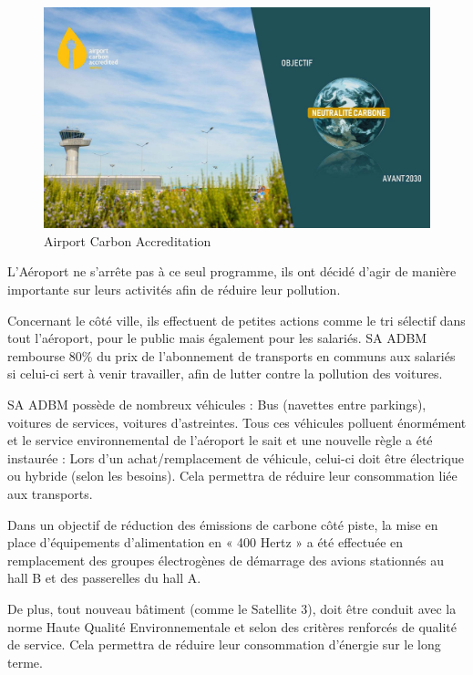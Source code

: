 \begin{figure}[hbt!]
  \centering
  \includegraphics[width=12cm]{Images/aca2030.jpg}
  \caption{Airport Carbon Accreditation}
  \label{fig:aca2030}
\end{figure}


L'Aéroport ne s'arrête pas à ce seul programme, ils ont décidé d'agir de manière importante sur leurs activités afin de réduire leur pollution.

Concernant le côté ville, ils effectuent de petites actions comme le tri sélectif dans tout l'aéroport, pour le public mais également pour les salariés. SA ADBM rembourse 80\% du prix de l'abonnement de transports en communs aux salariés si celui-ci sert à venir travailler, afin de lutter contre la pollution des voitures.

SA ADBM possède de nombreux véhicules : Bus (navettes entre parkings), voitures de services, voitures d'astreintes. Tous ces véhicules polluent énormément et le service environnemental de l'aéroport le sait et une nouvelle règle a été instaurée : Lors d'un achat/remplacement de véhicule, celui-ci doit être électrique ou hybride (selon les besoins). Cela permettra de réduire leur consommation liée aux transports.\newline


Dans un objectif de réduction des émissions de carbone côté piste, la mise en place d’équipements d’alimentation en « 400 Hertz » a été effectuée en remplacement des groupes électrogènes de démarrage des avions stationnés au hall B et des passerelles du hall A.

De plus, tout nouveau bâtiment (comme le Satellite 3), doit être conduit avec la norme Haute Qualité Environnementale et selon des critères renforcés de qualité de service. Cela permettra de réduire leur consommation d'énergie sur le long terme.\newline


